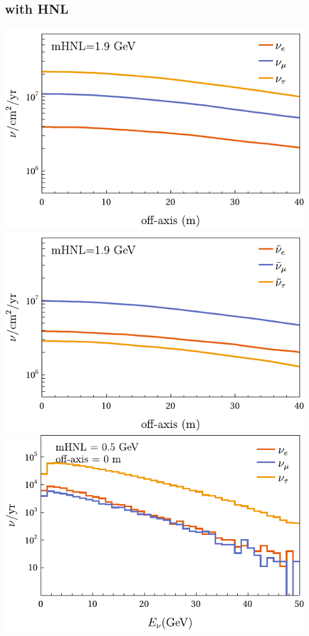 \documentclass[aps,prd,twocolumn,superscriptaddress,amsmath,amssymb]{revtex4}
\newcommand{\lw}{\linewidth}
\begin{document}
\subsection{with HNL}
\noindent
\includegraphics[width=\lw]{plots/meeting/431-meta-19.pdf}
\includegraphics[width=\lw]{plots/meeting/431-metabar-19.pdf}
\includegraphics[width=\lw]{plots/meeting/e-05-0.pdf}
\end{document}
